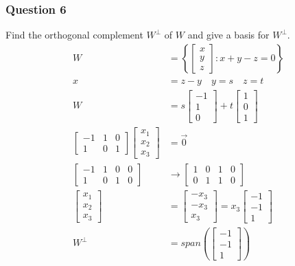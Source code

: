 \documentclass{math}
\begin{document}
\subsubsection*{Question 6}
Find the orthogonal complement \( W^{\bot} \) of \( W \) and give a basis for
\( W^{\bot} \).
\begin{align*}
  W &= \left\{\begin{bmatrix}x \\ y \\ z\end{bmatrix}: x+y-z = 0\right\} \\
  x &= z-y \quad y = s \quad z = t \\
  W &= s\begin{bmatrix}-1 \\ 1 \\ 0\end{bmatrix}+
    t\begin{bmatrix}1 \\ 0 \\ 1\end{bmatrix} \\
  \begin{bmatrix}
    -1 & 1 & 0 \\
    1 & 0 & 1
  \end{bmatrix}\begin{bmatrix}x_1 \\ x_2 \\ x_3\end{bmatrix} &= \vec{0} \\
  \left[\begin{array}{ccc|c}
    -1 & 1 & 0 & 0 \\
    1 & 0 & 1 & 0
  \end{array}\right] &\to \left[\begin{array}{ccc|c}
    1 & 0 & 1 & 0 \\
    0 & 1 & 1 & 0
  \end{array}\right] \\
  \begin{bmatrix}x_1 \\ x_2 \\ x_3\end{bmatrix} &= \begin{bmatrix}
    -x_3 \\ -x_3 \\ x_3
  \end{bmatrix} = x_3\begin{bmatrix}-1 \\ -1 \\ 1\end{bmatrix} \\
  W^{\bot} &= span\left(\begin{bmatrix}-1 \\ -1 \\ 1\end{bmatrix}\right)
\end{align*}
\end{document}
